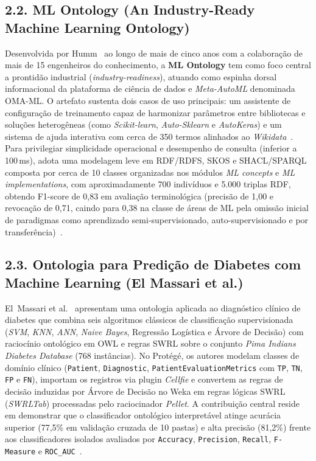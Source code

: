 \documentclass[11pt,a4paper]{article}
\newcommand{\onto}[1]{\texttt{\small #1}}
\begin{document}
\subsection{2.2. ML Ontology (An Industry-Ready Machine Learning Ontology)}

Desenvolvida por Humm~\cite{humm2026industry} ao longo de mais de cinco anos com a colaboração de mais de 15 engenheiros do conhecimento, a \textbf{ML Ontology} tem como foco central a prontidão industrial (\emph{industry-readiness}), atuando como espinha dorsal informacional da plataforma de ciência de dados e \emph{Meta-AutoML} denominada OMA-ML. O artefato sustenta dois casos de uso principais: um assistente de configuração de treinamento capaz de harmonizar parâmetros entre bibliotecas e soluções heterogêneas (como \emph{Scikit-learn}, \emph{Auto-Sklearn} e \emph{AutoKeras}) e um sistema de ajuda interativa com cerca de 350 termos alinhados ao \emph{Wikidata}~\cite{humm2026industry}. Para privilegiar simplicidade operacional e desempenho de consulta (inferior a 100\,ms), adota uma modelagem leve em RDF/RDFS, SKOS e SHACL/SPARQL composta por cerca de 10 classes organizadas nos módulos \emph{ML concepts} e \emph{ML implementations}, com aproximadamente 700 indivíduos e 5.000 triplas RDF, obtendo F1-score de 0,83 em avaliação terminológica (precisão de 1,00 e revocação de 0,71, caindo para 0,38 na classe de áreas de ML pela omissão inicial de paradigmas como aprendizado semi-supervisionado, auto-supervisionado e por transferência)~\cite{humm2026industry}.

\subsection{2.3. Ontologia para Predição de Diabetes com Machine Learning (El Massari et al.)}

El~Massari et al.~\cite{elmassari2022diabetes} apresentam uma ontologia aplicada ao diagnóstico clínico de diabetes que combina seis algoritmos clássicos de classificação supervisionada (\emph{SVM}, \emph{KNN}, \emph{ANN}, \emph{Naive Bayes}, Regressão Logística e Árvore de Decisão) com raciocínio ontológico em OWL e regras SWRL sobre o conjunto \emph{Pima Indians Diabetes Database} (768 instâncias). No Protégé, os autores modelam classes de domínio clínico (\onto{Patient}, \onto{Diagnostic}, \onto{PatientEvaluationMetrics} com \onto{TP}, \onto{TN}, \onto{FP} e \onto{FN}), importam os registros via plugin \emph{Cellfie} e convertem as regras de decisão induzidas por Árvore de Decisão no Weka em regras lógicas SWRL (\emph{SWRLTab}) processadas pelo raciocinador \emph{Pellet}. A contribuição central reside em demonstrar que o classificador ontológico interpretável atinge acurácia superior (77,5\% em validação cruzada de 10 pastas) e alta precisão (81,2\%) frente aos classificadores isolados avaliados por \onto{Accuracy}, \onto{Precision}, \onto{Recall}, \onto{F-Measure} e \onto{ROC\_AUC}~\cite{elmassari2022diabetes}.
\end{document}
